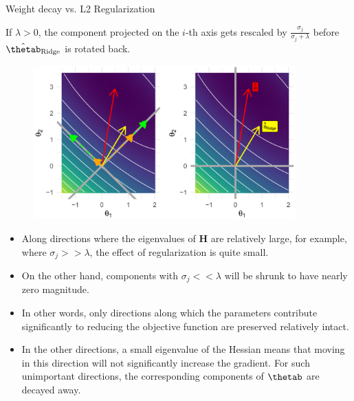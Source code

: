 \begin{vbframe}{Weight decay vs. L2 Regularization}
\framebreak
  
\begin{footnotesize}
If $\lambda > 0$, the component projected on the $i$-th axis gets rescaled by $\frac{\sigma_j}{\sigma_j + \lambda}$ before $\hat{\thetab}_{\text{Ridge}}$ is rotated back.
\end{footnotesize}

\begin{figure}
\includegraphics[width=0.9\textwidth]{figure_man/L2-regularization05.png}\\
\end{figure}


\framebreak

  
\begin{itemize} 
  \item Along directions where the eigenvalues of $\bm{H}$ are relatively large, for example, where $\sigma_j >> \lambda$, the effect of regularization is quite small.
  \item On the other hand, components with $\sigma_j << \lambda$ will be shrunk to have nearly zero magnitude.
  \item In other words, only directions along which the parameters contribute significantly to reducing the objective function are preserved relatively intact.
  \item In the other directions, a small eigenvalue of the Hessian means that moving in this direction will not significantly increase the gradient. For such unimportant directions, the corresponding components of $\thetab$ are decayed away.
  \end{itemize}
  
  \framebreak
  

\end{vbframe}
